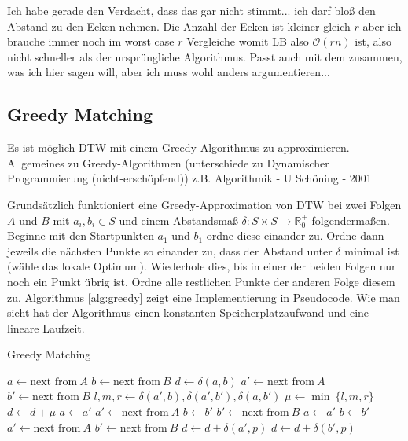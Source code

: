 \FIXME Ich habe gerade den Verdacht, dass das gar nicht stimmt... ich darf bloß den Abstand zu den Ecken nehmen. Die Anzahl der Ecken ist kleiner gleich $r$ aber ich brauche immer noch im worst case $r$ Vergleiche womit LB also \( \mathcal{O}(rn) \) ist, also nicht schneller als der ursprüngliche Algorithmus. Passt auch mit dem zusammen, was ich hier sagen will, aber ich muss wohl anders argumentieren...


\subsection{Greedy Matching} %
\label{sec:greedy}

Es ist möglich DTW mit einem Greedy-Algorithmus zu approximieren.
\TODO Allgemeines zu Greedy-Algorithmen (unterschiede zu Dynamischer Programmierung (nicht-erschöpfend)) z.B. Algorithmik - U Schöning - 2001

Grundsätzlich funktioniert eine Greedy-Approximation von DTW bei zwei Folgen $A$ und $B$ mit \(a_i,b_i \in S\) und einem Abstandsmaß \(\delta:S\times S \rightarrow \mathbb{R}_0^+\) folgendermaßen. Beginne mit den Startpunkten $a_1$ und $b_1$ ordne diese einander zu. Ordne dann jeweils die nächsten Punkte so einander zu, dass der Abstand unter \(\delta\) minimal ist (wähle das lokale Optimum). Wiederhole dies, bis in einer der beiden Folgen nur noch ein Punkt übrig ist. Ordne alle restlichen Punkte der anderen Folge diesem zu. Algorithmus \ref{alg:greedy} zeigt eine Implementierung in Pseudocode.
Wie man sieht hat der Algorithmus einen konstanten Speicherplatzaufwand und eine lineare Laufzeit.

\begin{algorithm}
  \caption{Greedy Matching}
  \label{alg:greedy}
  \begin{algorithmic}
    \STATE $a \gets \text{next from}~A$
    \STATE $b \gets \text{next from}~B$
    \STATE $d \gets \delta(a,b)$
    \STATE $a' \gets \text{next from}~A$
    \STATE $b' \gets \text{next from}~B$
      \STATE $l, m, r \gets \delta(a',b), \delta(a', b'), \delta(a, b')$
      \STATE $\mu \gets \min ~\{l, m, r\}$
      \STATE $d \gets d + \mu$
        \STATE $a \gets a'$
        \STATE $a' \gets \text{next from}~A$
        \STATE $b \gets b'$
        \STATE $b' \gets \text{next from}~B$
      \ELSE
        \STATE $a \gets a'$
        \STATE $b \gets b'$
        \STATE $a' \gets \text{next from}~A$
        \STATE $b' \gets \text{next from}~B$
      \ENDIF
    \ENDWHILE
        \STATE $d \gets d + \delta(a',p)$
      \ENDFOR
        \STATE $d \gets d + \delta(b',p)$
      \ENDFOR
    \ENDIF
  \end{algorithmic}
\end{algorithm}


